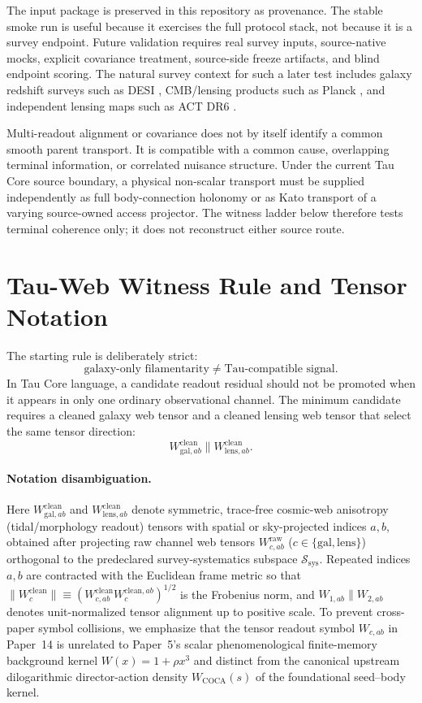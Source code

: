 \documentclass[11pt]{article}
\begin{document}
The input package is preserved in this repository as provenance.  The stable
smoke run is useful because it exercises the full protocol stack, not because
it is a survey endpoint.  Future validation requires real survey inputs,
source-native mocks, explicit covariance treatment, source-side freeze
artifacts, and blind endpoint scoring.  The natural survey context for such a
later test includes galaxy redshift surveys such as DESI \cite{desi2016},
CMB/lensing products such as Planck \cite{planck2018parameters}, and
independent lensing maps such as ACT DR6 \cite{actdr6lensing}.

Multi-readout alignment or covariance does not by itself identify a common
smooth parent transport. It is compatible with a common cause, overlapping
terminal information, or correlated nuisance structure. Under the current
Tau Core source boundary, a physical non-scalar transport must be supplied
independently as full body-connection holonomy or as Kato transport of a
varying source-owned access projector. The witness ladder below therefore
tests terminal coherence only; it does not reconstruct either source route.

\section{Tau-Web Witness Rule and Tensor Notation}

The starting rule is deliberately strict:
\[
\text{galaxy-only filamentarity} \neq
\text{Tau-compatible signal}.
\]
In Tau Core language, a candidate readout residual should not be promoted when
it appears in only one ordinary observational channel.  The minimum candidate
requires a cleaned galaxy web tensor and a cleaned lensing web tensor that
select the same tensor direction:
\[
W^{\mathrm{clean}}_{\mathrm{gal},ab} \parallel W^{\mathrm{clean}}_{\mathrm{lens},ab}.
\]

\paragraph{Notation disambiguation.}
Here $W^{\mathrm{clean}}_{\mathrm{gal},ab}$ and
$W^{\mathrm{clean}}_{\mathrm{lens},ab}$ denote symmetric, trace-free cosmic-web
anisotropy (tidal/morphology readout) tensors with spatial or sky-projected
indices $a,b$, obtained after projecting raw channel web tensors
$W^{\mathrm{raw}}_{c,ab}$ ($c \in \{\mathrm{gal},\mathrm{lens}\}$) orthogonal to
the predeclared survey-systematics subspace $\mathcal{S}_{\mathrm{sys}}$.
Repeated indices $a,b$ are contracted with the Euclidean frame metric so that
$\|W^{\mathrm{clean}}_c\| \equiv (W^{\mathrm{clean}}_{c,ab}
W_c^{\mathrm{clean},ab})^{1/2}$ is the Frobenius norm, and $W_{1,ab} \parallel
W_{2,ab}$ denotes unit-normalized tensor alignment up to positive scale.  To
prevent cross-paper symbol collisions, we emphasize that the tensor readout
symbol $W_{c,ab}$ in Paper~14 is unrelated to Paper~5's scalar phenomenological
finite-memory background kernel $W(x) = 1 + \rho x^3$ and distinct from the
canonical upstream dilogarithmic director-action density $W_{\mathrm{COCA}}(s)$
of the foundational seed--body kernel.
\end{document}
